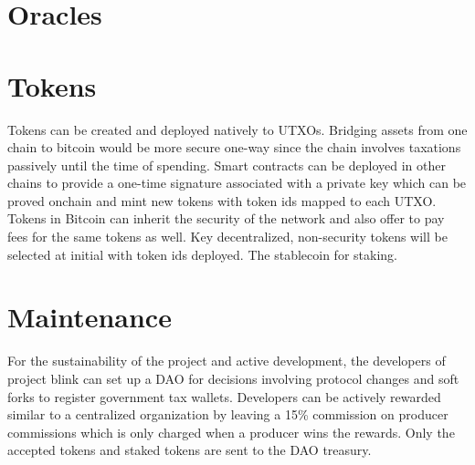 \documentclass[a4paper,10pt]{article}
\begin{document}
\section{Oracles}

\section{Tokens}
Tokens can be created and deployed natively to UTXOs. Bridging assets from one chain to bitcoin would be more secure one-way since the chain involves taxations passively until the time of spending. Smart contracts can be deployed in other chains to provide a one-time signature associated with a private key which can be proved onchain and mint new tokens with token ids mapped to each UTXO. Tokens in Bitcoin can inherit the security of the network and also offer to pay fees for the same tokens as well. Key decentralized, non-security tokens will be selected at initial with token ids deployed. 
The stablecoin for staking.
\section{Maintenance}
For the sustainability of the project and active development, the developers of project blink can set up a DAO for decisions involving protocol changes and soft forks to register government tax wallets. Developers can be actively rewarded similar to a centralized organization by leaving a 15\% commission on producer commissions which is only charged when a producer wins the rewards. Only the accepted tokens and staked tokens are sent to the DAO treasury.
\end{document}
